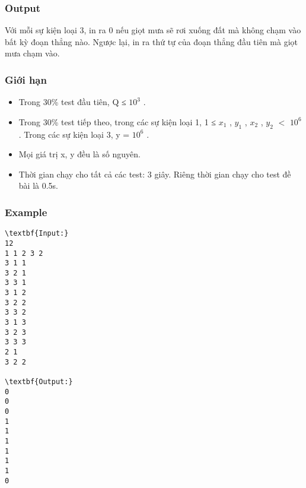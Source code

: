 \subsubsection{Output}

Với mỗi sự kiện loại 3, in ra 0 nếu giọt mưa sẽ rơi xuống đất mà không chạm vào bất kỳ đoạn thẳng nào. Ngược lại, in ra thứ tự của đoạn thẳng đầu tiên mà giọt mưa chạm vào.

\subsubsection{Giới hạn}
\begin{itemize}
	\item Trong 30\% test đầu tiên, Q ≤ $10^{3}$ .
	\item Trong 30\% test tiếp theo, trong các sự kiện loại 1, 1 ≤ $x_{1}$ , $y_{1}$ , $x_{2}$ , $y_{2}$ $<$ $10^{6}$ . Trong các sự kiện loại 3, y = $10^{6}$ .
	\item Mọi giá trị x, y đều là số nguyên.
	\item Thời gian chạy cho tất cả các test: 3 giây. Riêng thời gian chạy cho test đề bài là 0.5s.
\end{itemize}

\subsubsection{Example}
\begin{verbatim}
\textbf{Input:}
12
1 1 2 3 2
3 1 1
3 2 1
3 3 1
3 1 2
3 2 2
3 3 2
3 1 3
3 2 3
3 3 3
2 1
3 2 2

\textbf{Output:}
0
0
0
1
1
1
1
1
1
0
\end{verbatim}

